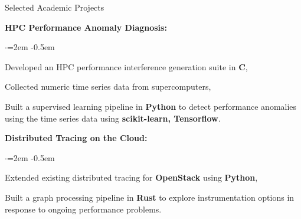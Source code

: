 \documentclass{resume}
\begin{document}

\begin{rSection}{Selected Academic Projects} \itemsep -2pt
\item {\bf HPC Performance Anomaly Diagnosis:}
  \begin{list}{$\cdot$}{\leftmargin=2em} %
    \itemsep -0.5em \vspace{-0.5em} %
  \item Developed an HPC performance interference generation suite in {\bf C},
  \item Collected numeric time series data from supercomputers,
  \item Built a supervised learning pipeline in {\bf Python} to detect
    performance anomalies using the time series data using {\bf scikit-learn,
      Tensorflow}.
  \end{list}
  \item {\bf Distributed Tracing on the Cloud:}
  \begin{list}{$\cdot$}{\leftmargin=2em} %
    \itemsep -0.5em \vspace{-0.5em} %
  \item Extended existing distributed tracing for {\bf OpenStack} using {\bf
      Python},
  \item Built a graph processing pipeline in {\bf Rust} to explore
    instrumentation options in response to ongoing performance problems.
  \end{list}
\end{rSection}

\end{document}
